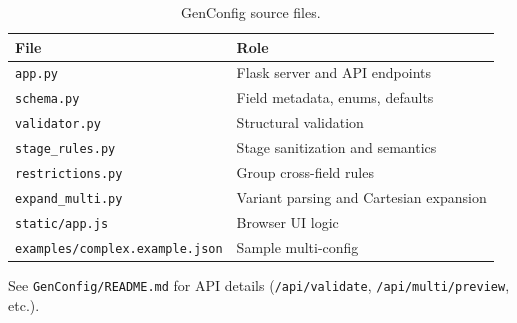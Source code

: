 \begin{table}[H]
\centering
\small
\begin{tabular}{@{}ll@{}}
\toprule
\textbf{File} & \textbf{Role} \\
\midrule
\texttt{app.py} & Flask server and API endpoints \\
\texttt{schema.py} & Field metadata, enums, defaults \\
\texttt{validator.py} & Structural validation \\
\texttt{stage\_rules.py} & Stage sanitization and semantics \\
\texttt{restrictions.py} & Group cross-field rules \\
\texttt{expand\_multi.py} & Variant parsing and Cartesian expansion \\
\texttt{static/app.js} & Browser UI logic \\
\texttt{examples/complex.example.json} & Sample multi-config \\
\bottomrule
\end{tabular}
\caption{GenConfig source files.}
\end{table}

See \texttt{GenConfig/README.md} for API details (\texttt{/api/validate}, \texttt{/api/multi/preview}, etc.).
